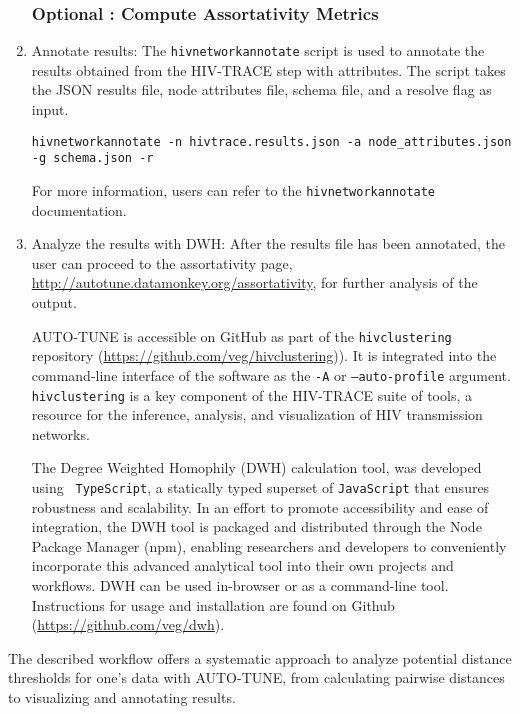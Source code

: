 \documentclass[utf8]{FrontiersinHarvard} %
\begin{document}
\begin{enumerate}
	      \subsubsection{Optional : Compute Assortativity Metrics}

	      \item{ Annotate results: The {\tt hivnetworkannotate} script is used to annotate the results obtained from the HIV-TRACE step with attributes. The script takes the JSON results file, node attributes file, schema file, and a resolve flag as input.
	                  \begin{lstlisting}[style=BashInputStyle]
hivnetworkannotate -n hivtrace.results.json -a node_attributes.json -g schema.json -r
	\end{lstlisting}
	                  For more information, users can refer to the {\tt hivnetworkannotate}
	                  documentation. }

	      \item{ Analyze the results with DWH: After the results file has been annotated, the user can proceed to the assortativity page, \url{http://autotune.datamonkey.org/assortativity}, for further analysis of the output. }

	      AUTO-TUNE is accessible on GitHub as part of the {\tt hivclustering} repository
	      (\url{https://github.com/veg/hivclustering})). It is integrated into the
	      command-line interface of the software as the {\tt -A} or {\tt --auto-profile}
	      argument. {\tt hivclustering} is a key component of the HIV-TRACE suite of
	      tools, a resource for the inference, analysis, and visualization of HIV
	      transmission networks.

	      The Degree Weighted Homophily (DWH) calculation tool, was developed using {\tt
			      TypeScript}, a statically typed superset of {\tt JavaScript} that ensures
	      robustness and scalability. In an effort to promote accessibility and ease of
	      integration, the DWH tool is packaged and distributed through the Node Package
	      Manager (npm), enabling researchers and developers to conveniently incorporate
	      this advanced analytical tool into their own projects and workflows. DWH can be
	      used in-browser or as a command-line tool. Instructions for usage and
	      installation are found on Github (\url{https://github.com/veg/dwh}).

\end{enumerate}

The described workflow offers a systematic approach to analyze potential
distance thresholds for one's data with AUTO-TUNE, from calculating pairwise
distances to visualizing and annotating results.
\end{document}
